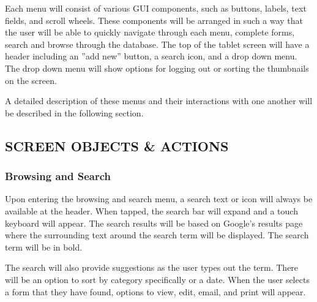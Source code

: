 \documentclass[twoside,letterpaper]{article}
\begin{document}
{{\noindent Each menu will consist of various GUI components, such as buttons, labels, text fields, and scroll wheels. These components will be arranged in such a way that the user will be able to quickly navigate through each menu, complete forms, search and browse through the database. 
The top of the tablet screen will have a header including an ''add new'' button, a search icon, and a drop down menu. The drop down menu will show options for logging out or sorting the thumbnails on the screen.
\newline

\noindent A detailed description of these menus and their interactions with one another will be described in the following section.
}
\newpage
\subsection[SCREEN OBJECTS \& ACTIONS]{\rmfamily\bfseries\color{black}
SCREEN OBJECTS \& ACTIONS}
\subsubsection[Browsing and Search]{\rmfamily\bfseries\color{black}
Browsing and Search}
Upon entering the browsing and search menu, a search text or icon will always be available at the header. When tapped, the search bar will expand and a touch keyboard will appear. The search results will be based on Google's results page where the surrounding text around the search term will be displayed. The search term will be in bold.
\newline

\noindent The search will also provide suggestions as the user types out the term. There will be an option to sort by category specifically or a date. When the user selects a form that they have found,  options to view, edit, email, and print will appear.

}
\end{document}
